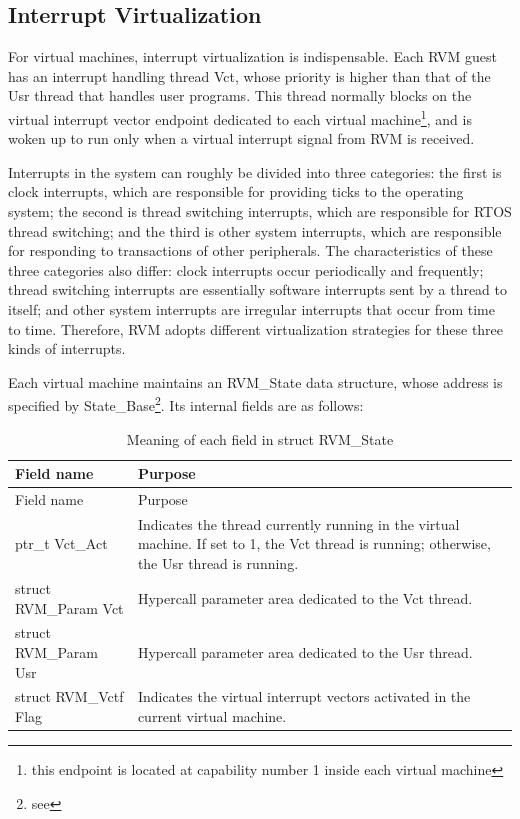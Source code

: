 \subsection{Interrupt Virtualization}\label{subsec:2-2-4}

For virtual machines, interrupt virtualization is indispensable. Each RVM guest has an interrupt handling thread Vct, whose priority is higher than that of the Usr thread that handles user programs. This thread normally blocks on the virtual interrupt vector endpoint dedicated to each virtual machine\footnote{this endpoint is located at capability number 1 inside each virtual machine}, and is woken up to run only when a virtual interrupt signal from RVM is received.

Interrupts in the system can roughly be divided into three categories: the first is clock interrupts, which are responsible for providing ticks to the operating system; the second is thread switching interrupts, which are responsible for RTOS thread switching; and the third is other system interrupts, which are responsible for responding to transactions of other peripherals. The characteristics of these three categories also differ: clock interrupts occur periodically and frequently; thread switching interrupts are essentially software interrupts sent by a thread to itself; and other system interrupts are irregular interrupts that occur from time to time. Therefore, RVM adopts different virtualization strategies for these three kinds of interrupts.

Each virtual machine maintains an RVM\_State data structure, whose address is specified by State\_Base\footnote{see }. Its internal fields are as follows:

\begin{xltabular}{\textwidth}{@{}>{\hsize\raggedright\arraybackslash}X>{\hsize\raggedright\arraybackslash}X@{}}
\caption{Meaning of each field in struct RVM\_\allowbreak{}State}\label{tab:2-3}\\
\toprule
Field name & Purpose\tabularnewline
\endfirsthead
\toprule
Field name & Purpose\tabularnewline
\midrule
\endhead
\bottomrule
\endlastfoot
ptr\_\allowbreak{}t Vct\_\allowbreak{}Act &
Indicates the thread currently running in the virtual machine. If set to 1, the Vct thread is running; otherwise, the Usr thread is running.\tabularnewline
struct RVM\_\allowbreak{}Param Vct & Hypercall parameter area dedicated to the Vct thread.\tabularnewline
struct RVM\_\allowbreak{}Param Usr & Hypercall parameter area dedicated to the Usr thread.\tabularnewline
struct RVM\_\allowbreak{}Vctf Flag &
Indicates the virtual interrupt vectors activated in the current virtual machine.\tabularnewline
\end{xltabular}

